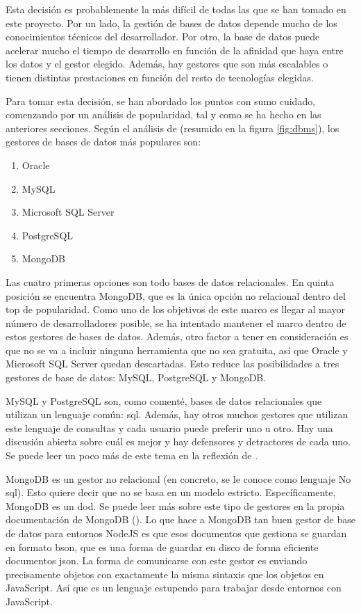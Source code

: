 Esta decisión es probablemente la más difícil de todas las que se han tomado en este proyecto. Por un lado, la gestión de bases de datos depende mucho de los conocimientos técnicos del desarrollador. Por otro, la base de datos puede acelerar mucho el tiempo de desarrollo en función de la afinidad que haya entre los datos y el gestor elegido. Además, hay gestores que son más escalables o tienen distintas prestaciones en función del resto de tecnologías elegidas.

Para tomar esta decisión, se han abordado los puntos con sumo cuidado, comenzando por un análisis de popularidad, tal y como se ha hecho en las anteriores secciones. Según el análisis de \citet{MPDBITW} (resumido en la figura \cref{fig:dbms}), los gestores de bases de datos más populares son:
\begin{enumerate}
	\item Oracle
	\item MySQL
	\item Microsoft SQL Server
	\item PostgreSQL
	\item MongoDB
\end{enumerate}
Las cuatro primeras opciones son todo bases de datos relacionales. En quinta posición se encuentra MongoDB, que es la única opción no relacional dentro del top de popularidad. Como uno de los objetivos de este marco es llegar al mayor número de desarrolladores posible, se ha intentado mantener el marco dentro de estos gestores de bases de datos. Además, otro factor a tener en consideración es que no se va a incluir ninguna herramienta que no sea gratuita, así que Oracle y Microsoft SQL Server quedan descartadas. Esto reduce las posibilidades a tres gestores de base de datos: MySQL, PostgreSQL y MongoDB.

MySQL y PostgreSQL son, como comenté, bases de datos relacionales que utilizan un lenguaje común: \gls{sql}. Además, hay otros muchos gestores que utilizan este lenguaje de consultas y cada usuario puede preferir uno u otro. Hay una discusión abierta sobre cuál es mejor y hay defensores y detractores de cada uno. Se puede leer un poco más de este tema en la reflexión de \citet{MYSVPOS}.

MongoDB es un gestor no relacional (en concreto, se le conoce como lenguaje No \gls{sql}). Esto quiere decir que no se basa en un modelo estricto. Específicamente, MongoDB es un \gls{dod}. Se puede leer más sobre este tipo de gestores en la propia documentación de MongoDB (\cite{DOCORDB}). Lo que hace a MongoDB tan buen gestor de base de datos para entornos NodeJS es que esos documentos que gestiona se guardan en formato \gls{bson}, que es una forma de guardar en disco de forma eficiente documentos \gls{json}. La forma de comunicarse con este gestor es enviando precisamente objetos con exactamente la misma sintaxis que los objetos en JavaScript. Así que es un lenguaje estupendo para trabajar desde entornos con JavaScript.

